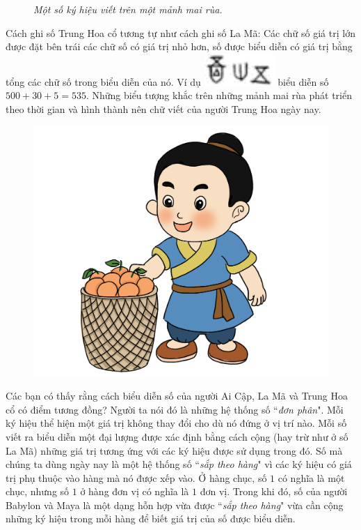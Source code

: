 \begin{multicols}{2}
\begin{figure}[H]
		\caption{\textit{\color{toancuabi}Một số ký hiệu viết trên một mảnh mai rùa.}}
		\vspace*{-10pt}
	\end{figure}
	Cách ghi số Trung Hoa cổ tương tự như cách ghi số La Mã: Các chữ số giá trị lớn được đặt bên trái các chữ số có  giá trị nhỏ hơn, số được biểu diễn có giá trị bằng tổng các chữ số trong biểu diễn của nó. Ví dụ \includegraphics[scale=0.25]{china5} biểu diễn số $500 + 30 + 5 = 535$. Những biểu tượng khắc trên những mảnh mai rùa phát triển theo thời gian và hình thành nên chữ viết của người Trung Hoa ngày nay. 
	\begin{figure}[H]
		\centering
		\vspace*{-5pt}
		\captionsetup{labelformat= empty, justification=centering}
		\includegraphics[width=0.9\linewidth]{20.12-pi.3}
		\vspace*{-10pt}
	\end{figure}
	Các bạn có thấy rằng cách biểu diễn số của người Ai Cập, La Mã và Trung Hoa cổ có điểm tương đồng? Người ta nói đó là những hệ thống số ``\textit{đơn phân}". Mỗi ký hiệu thể hiện một giá trị không thay đổi cho dù nó đứng ở vị trí nào. Mỗi số viết ra biểu diễn một đại lượng được xác định bằng cách  cộng (hay trừ như ở số La Mã) những giá trị tương ứng với các ký hiệu được sử dụng trong đó. Số mà chúng ta dùng ngày nay là một hệ thống số ``\textit{sắp theo hàng}" vì các ký hiệu có giá trị phụ thuộc vào hàng mà nó được xếp vào. Ở hàng chục, số $1$ có nghĩa là một chục, nhưng số $1$ ở hàng đơn vị có nghĩa là $1$ đơn vị. Trong khi đó, số của người Babylon và Maya là một dạng hỗn hợp vừa được ``\textit{sắp theo hàng}" vừa cần cộng những ký hiệu trong mỗi hàng để biết giá trị của số được biểu diễn.

\end{multicols}
